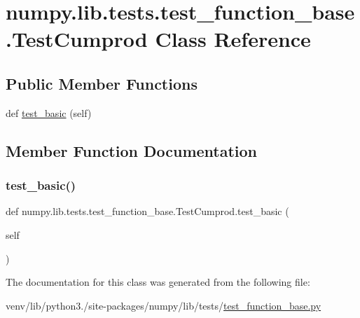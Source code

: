 \hypertarget{classnumpy_1_1lib_1_1tests_1_1test__function__base_1_1TestCumprod}{}\section{numpy.\+lib.\+tests.\+test\+\_\+function\+\_\+base.\+Test\+Cumprod Class Reference}
\label{classnumpy_1_1lib_1_1tests_1_1test__function__base_1_1TestCumprod}
\subsection*{Public Member Functions}
\begin{DoxyCompactItemize}
\item 
def \hyperlink{classnumpy_1_1lib_1_1tests_1_1test__function__base_1_1TestCumprod_a36840edcd115ff61b2d32282c40143c1}{test\+\_\+basic} (self)
\end{DoxyCompactItemize}


\subsection{Member Function Documentation}
\mbox{\label{classnumpy_1_1lib_1_1tests_1_1test__function__base_1_1TestCumprod_a36840edcd115ff61b2d32282c40143c1}} 
\subsubsection{\texorpdfstring{test\+\_\+basic()}{test\_basic()}}
{\footnotesize\ttfamily def numpy.\+lib.\+tests.\+test\+\_\+function\+\_\+base.\+Test\+Cumprod.\+test\+\_\+basic (\begin{DoxyParamCaption}\item[{}]{self }\end{DoxyParamCaption})}



The documentation for this class was generated from the following file\+:\begin{DoxyCompactItemize}
\item 
venv/lib/python3./site-\/packages/numpy/lib/tests/\hyperlink{lib_2tests_2test__function__base_8py}{test\+\_\+function\+\_\+base.\+py}\end{DoxyCompactItemize}

